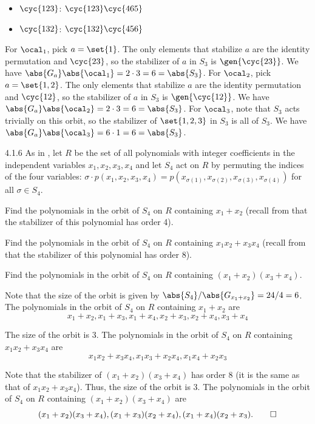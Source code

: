 \begin{solenum}
\begin{itemize}
		\item $\cyc{1 2 3}$: $\cyc{1 2 3}\cyc{4 6 5}$
		\item $\cyc{1 3 2}$: $\cyc{1 3 2}\cyc{4 5 6}$
	\end{itemize}
	For $\ocal_1$, pick $a = \set{1}$.
	The only elements that stabilize $a$ are the identity permutation and $\cyc{2 3}$, so the stabilizer of $a$ in $S_3$ is $\gen{\cyc{2 3}}$.
	We have $\abs{G_a}\abs{\ocal_1} = 2 \cdot 3 = 6 = \abs{S_3}$.
	For $\ocal_2$, pick $a = \set{1, 2}$.
	The only elements that stabilize $a$ are the identity permutation and $\cyc{1 2}$, so the stabilizer of $a$ in $S_3$ is $\gen{\cyc{1 2}}$.
	We have $\abs{G_a}\abs{\ocal_2} = 2 \cdot 3 = 6 = \abs{S_3}$.
	For $\ocal_3$, note that $S_3$ acts trivially on this orbit, so the stabilizer of $\set{1, 2, 3}$ in $S_3$ is all of $S_3$.
	We have $\abs{G_a}\abs{\ocal_3} = 6 \cdot 1 = 6 = \abs{S_3}$.
\end{solenum}

\begin{exercise}{4.1.6}
	As in , let $R$ be the set of all polynomials with integer coefficients in the independent variables \(x_1,x_2,x_3,x_4\) and let $S_4$ act on $R$ by permuting the indices of the four variables: \(\sigma \cdot p(x_1,x_2,x_3,x_4) = p(x_{\sigma(1)}, x_{\sigma(2)}, x_{\sigma(3)}, x_{\sigma(4)})\) for all \(\sigma \in S_4\).
	\begin{subexercises}
		\item Find the polynomials in the orbit of $S_4$ on $R$ containing \(x_1 + x_2\) (recall from  that the stabilizer of this polynomial has order 4).
		\item Find the polynomials in the orbit of $S_4$ on $R$ containing \(x_1 x_2 + x_3 x_4\) (recall from  that the stabilizer of this polynomial has order 8).
		\item Find the polynomials in the orbit of $S_4$ on $R$ containing \((x_1 + x_2)(x_3 + x_4)\).
	\end{subexercises}
\end{exercise}

\begin{solenum}
	\item Note that the size of the orbit is given by \(\abs{S_4}/\abs{G_{x_1 + x_2}} = 24/4 = 6\).
	The polynomials in the orbit of $S_4$ on $R$ containing \(x_1 + x_2\) are
	\[
		x_1 + x_2, x_1 + x_3, x_1 + x_4, x_2 + x_3, x_2 + x_4, x_3 + x_4
	\]
	\item The size of the orbit is 3.
	The polynomials in the orbit of $S_4$ on $R$ containing \(x_1 x_2 + x_3 x_4\) are
	\[
		x_1 x_2 + x_3 x_4, x_1 x_3 + x_2 x_4, x_1 x_4 + x_2 x_3
	\]
	\item Note that the stabilizer of \((x_1 + x_2)(x_3 + x_4)\) has order 8 (it is the same as that of \(x_1 x_2 + x_3 x_4\)).
	Thus, the size of the orbit is 3.
	The polynomials in the orbit of $S_4$ on $R$ containing \((x_1 + x_2)(x_3 + x_4)\) are
	\[
		(x_1 + x_2)(x_3 + x_4), (x_1 + x_3)(x_2 + x_4), (x_1 + x_4)(x_2 + x_3). \qedhere
	\]
\end{solenum}


